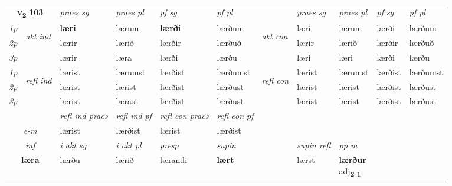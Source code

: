 \noindent
\begin{tabular}{lllllllllll} \toprule
\multicolumn{2}{c}{\textbf{v{\textsubscript{2}}} \Large{\textbf{103}}}  &  \textit{praes sg}  & \textit{praes pl}  &\textit{ pf sg} & \textit{pf pl} &  &  \textit{praes sg}  & \textit{praes pl}  & \textit{pf sg} & \textit{pf pl } \\*
	\cmidrule{3-6} \cmidrule{8-11}
 {\textit{1p}} & \multirow{3}{*}{\begin{turn}{90}\textit{akt ind}\end{turn}} & \textbf{læri} & lærum & \textbf{lærði} & lærðum & \multirow{3}{*}{\begin{turn}{90}\textit{akt con}\end{turn}} &læri & lærum & lærði & lærðum\\*
 {\textit{2p}} &  &  lærir  & lærið & lærðir & lærðuð & & lærir & lærið & lærðir & lærðuð \\*
{\textit{3p}} &  & lærir & læra & lærði & lærðu & & læri & læri& lærði & lærðu \\*
\cmidrule{3-6} \cmidrule{8-11}
 {\textit{1p}} & \multirow{3}{*}{\begin{turn}{90}\textit{refl ind}\end{turn}}  & lærist & lærumst & lærðist & lærðumst & \multirow{3}{*}{\begin{turn}{90}\textit{refl con}\end{turn}}  &lærist & lærumst & lærðist & lærðumst \\*
 {\textit{2p}} &  & lærist & lærist & lærðist & lærðust & &lærist & lærist & lærðist & lærðust \\*
 {\textit{3p}}  & & lærist & lærast & lærðist & lærðust & & lærist & lærist& lærðist & lærðust \\*
\cmidrule{3-6} \cmidrule{8-11}

 & & \textit{refl ind praes} & \textit{refl ind pf} & \textit{refl con praes} & \textit{refl con pf} \\*
 \multicolumn{2}{c}{ \textit{e-m} }& lærist & lærðist & lærist & lærðist \\*

\cmidrule{3-9}
   \multicolumn{2}{c}{\textit{inf}}  & \textit{i akt sg} & \textit{i akt pl}   & \textit{presp} & \textit{supin} && \textit{supin refl} & \textit{pp m} \\*
  \multicolumn{2}{c}{\textbf{læra}} & lærðu  & lærið   & lærandi &  \textbf{lært} && lærst & \specialcell{\textbf{lærður} \\ adj\textbf{\textsubscript{2-1}}} \\*
\end{tabular}

